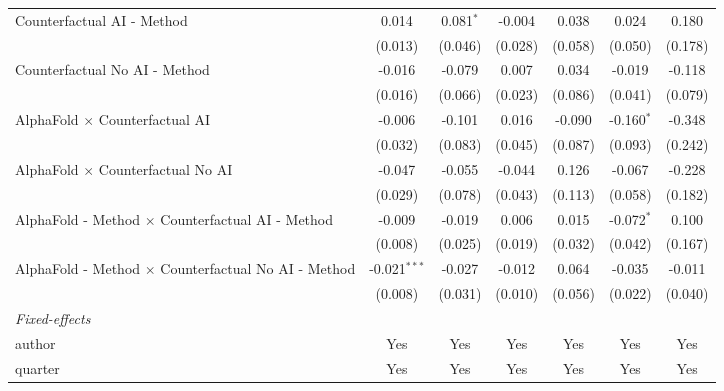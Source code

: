 \begin{tabular}{lcccccc}
   Counterfactual AI - Method                                 & 0.014          & 0.081$^{*}$ & -0.004       & 0.038   & 0.024         & 0.180\\   
                                                              & (0.013)        & (0.046)     & (0.028)      & (0.058) & (0.050)       & (0.178)\\   
   Counterfactual No AI - Method                              & -0.016         & -0.079      & 0.007        & 0.034   & -0.019        & -0.118\\   
                                                              & (0.016)        & (0.066)     & (0.023)      & (0.086) & (0.041)       & (0.079)\\   
   AlphaFold $\times$ Counterfactual AI                       & -0.006         & -0.101      & 0.016        & -0.090  & -0.160$^{*}$  & -0.348\\   
                                                              & (0.032)        & (0.083)     & (0.045)      & (0.087) & (0.093)       & (0.242)\\   
   AlphaFold $\times$ Counterfactual No AI                    & -0.047         & -0.055      & -0.044       & 0.126   & -0.067        & -0.228\\   
                                                              & (0.029)        & (0.078)     & (0.043)      & (0.113) & (0.058)       & (0.182)\\   
   AlphaFold - Method $\times$ Counterfactual AI - Method     & -0.009         & -0.019      & 0.006        & 0.015   & -0.072$^{*}$  & 0.100\\   
                                                              & (0.008)        & (0.025)     & (0.019)      & (0.032) & (0.042)       & (0.167)\\   
   AlphaFold - Method $\times$ Counterfactual No AI - Method  & -0.021$^{***}$ & -0.027      & -0.012       & 0.064   & -0.035        & -0.011\\   
                                                              & (0.008)        & (0.031)     & (0.010)      & (0.056) & (0.022)       & (0.040)\\   
   \midrule
   \emph{Fixed-effects}\\
   author                                                     & Yes            & Yes         & Yes          & Yes     & Yes           & Yes\\  
   quarter                                                    & Yes            & Yes         & Yes          & Yes     & Yes           & Yes\\  

\end{tabular}
